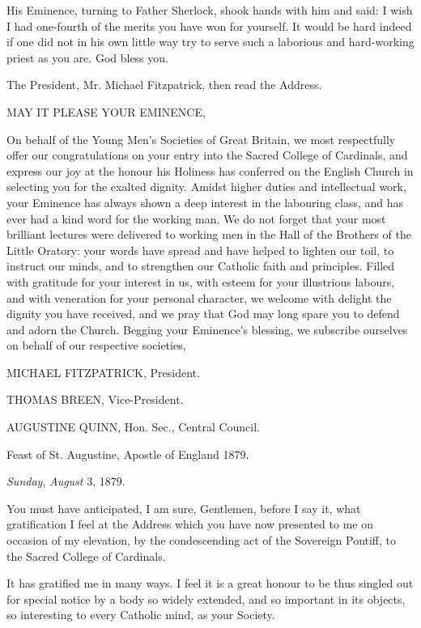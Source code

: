 His Eminence, turning to Father Sherlock, shook hands with him and
said: I wish I had one-fourth of the merits you have won for yourself.
It would be hard indeed if one did not in his own little way try to
serve such a laborious and hard-working priest as you are. God bless
you.

The President, Mr. Michael Fitzpatrick, then read the Address.


MAY IT PLEASE
YOUR EMINENCE,

On behalf of the Young Men's Societies of Great Britain, we most
respectfully offer our congratulations on your entry into the Sacred
College of Cardinals, and express our joy at the honour his Holiness
has conferred on the English Church in selecting you for the exalted dignity. Amidst higher duties and intellectual work, your
Eminence has always shown a deep interest in the labouring class, and
has ever had a kind word for the working man. We do not forget that
your most brilliant lectures were delivered to working men in the Hall
of the Brothers of the Little Oratory: your words have spread and have
helped to lighten our toil, to instruct our minds, and to strengthen
our Catholic faith and principles. Filled with gratitude for your
interest in us, with esteem for your illustrious labours, and with
veneration for your personal character, we welcome with delight the
dignity you have received, and we pray that God may long spare you to
defend and adorn the Church. Begging your Eminence's blessing, we
subscribe ourselves on behalf of our respective societies,

MICHAEL FITZPATRICK,
President.

THOMAS BREEN,
Vice-President.

AUGUSTINE QUINN, Hon.
Sec., Central Council.

Feast of St. Augustine, Apostle of England 1879.


\emph{Sunday}, \emph{August} 3, 1879.

You must have anticipated, I am sure, Gentlemen, before I say it, what
gratification I feel at the Address which you have now presented
to me on occasion of my elevation, by the condescending act of the
Sovereign Pontiff, to the Sacred College of Cardinals.

It has gratified me in many ways. I feel it is a great honour to be
thus singled out for special notice by a body so widely extended, and
so important in its objects, so interesting to every Catholic mind, as
your Society.

